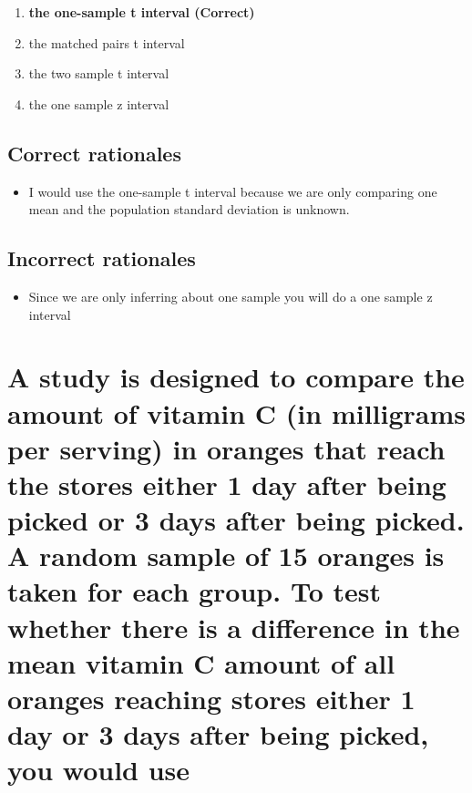 \documentclass[letterpaper,9pt,twoside,printwatermark=false]{pinp}
\providecommand{\tightlist}{%
  \setlength{\itemsep}{0pt}\setlength{\parskip}{0pt}}
\begin{document}
\begin{enumerate}
\def\labelenumi{\alph{enumi}.}
\tightlist
\item
  \textbf{the one-sample t interval (Correct)}
\item
  the matched pairs t interval
\item
  the two sample t interval
\item
  the one sample z interval
\end{enumerate}

\subsection{Correct rationales}\label{correct-rationales-3}

\begin{itemize}
\tightlist
\item
  I would use the one-sample t interval because we are only comparing
  one mean and the population standard deviation is unknown.
\end{itemize}

\subsection{Incorrect rationales}\label{incorrect-rationales-3}

\begin{itemize}
\tightlist
\item
  Since we are only inferring about one sample you will do a one sample
  z interval
\end{itemize}

\section{A study is designed to compare the amount of vitamin C (in
milligrams per serving) in oranges that reach the stores either 1 day
after being picked or 3 days after being picked. A random sample of 15
oranges is taken for each group. To test whether there is a difference
in the mean vitamin C amount of all oranges reaching stores either 1 day
or 3 days after being picked, you would
use}\label{a-study-is-designed-to-compare-the-amount-of-vitamin-c-in-milligrams-per-serving-in-oranges-that-reach-the-stores-either-1-day-after-being-picked-or-3-days-after-being-picked.-a-random-sample-of-15-oranges-is-taken-for-each-group.-to-test-whether-there-is-a-difference-in-the-mean-vitamin-c-amount-of-all-oranges-reaching-stores-either-1-day-or-3-days-after-being-picked-you-would-use}
\end{document}
